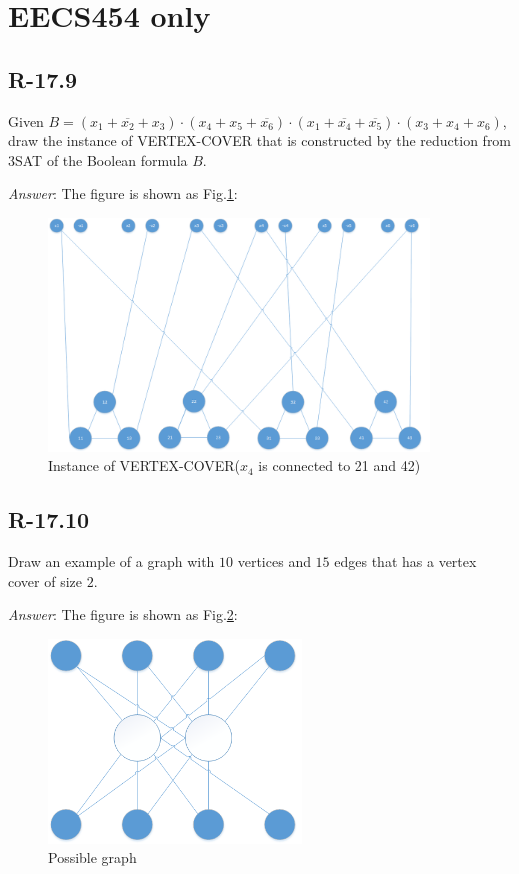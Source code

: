 \documentclass[11pt]{article}
\begin{document}
\section{EECS454 only}
\subsection{R-17.9}
Given $B=(x_1+\overline{x_2}+x_3)\cdot(x_4+x_5+\overline{x_6})\cdot(x_1+\overline{x_4}+\overline{x_5})\cdot(x_3+x_4+x_6)$, draw the instance of VERTEX-COVER that is constructed by the reduction from 3SAT of the Boolean formula $B$.

\noindent \emph{Answer}: The figure is shown as Fig.\ref{fig:fig1}:
\begin{figure}[!h]
	\centering
	\includegraphics[width=0.9\textwidth]{Figure/R-179.png}
	\caption{Instance of VERTEX-COVER($x_4$ is connected to 21 and 42)}
	\label{fig:fig1}
\end{figure}
\subsection{R-17.10}
Draw an example of a graph with $10$ vertices and $15$ edges that has a vertex cover of size $2$.

\noindent \emph{Answer}: The figure is shown as Fig.\ref{fig:fig2}:
\begin{figure}[!h]
	\centering
	\includegraphics[width=0.6\textwidth]{Figure/R-1710.png}
	\caption{Possible graph}
	\label{fig:fig2}
\end{figure}
\end{document}
